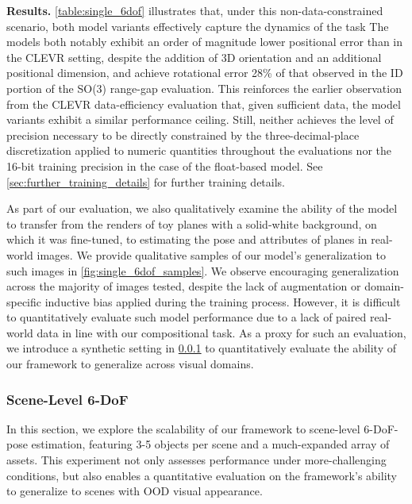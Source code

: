 \noindent\textbf{Results.}
\cref{table:single_6dof} illustrates that, under this non-data-constrained scenario, both model variants effectively capture the dynamics of the task
The models both notably exhibit an order of magnitude lower positional error than in the CLEVR setting, despite the addition of 3D orientation and an additional positional dimension, and achieve rotational error 28\% of that observed in the ID portion of the SO(3) range-gap evaluation.
This reinforces the earlier observation from the CLEVR data-efficiency evaluation that, given sufficient data, the model variants exhibit a similar performance ceiling.
Still, neither achieves the level of precision necessary to be directly constrained by the three-decimal-place discretization applied to numeric quantities throughout the evaluations nor the 16-bit training precision in the case of the float-based model.
See \cref{sec:further_training_details} for further training details.

As part of our evaluation, we also qualitatively examine the ability of the model to transfer from the renders of toy planes with a solid-white background, on which it was fine-tuned, to estimating the pose and attributes of planes in real-world images.
We provide qualitative samples of our model's generalization to such images in \cref{fig:single_6dof_samples}.
We observe encouraging generalization across the majority of images tested, despite the lack of augmentation or domain-specific inductive bias applied during the training process.
However, it is difficult to quantitatively evaluate such model performance due to a lack of paired real-world data in line with our compositional task.
As a proxy for such an evaluation, we introduce a synthetic setting in \cref{sssec:scene_6dof} to quantitatively evaluate the ability of our framework to generalize across visual domains.

\subsubsection{Scene-Level 6-DoF}\label{sssec:scene_6dof}


In this section, we explore the scalability of our framework to scene-level 6-DoF-pose estimation, featuring 3-5 objects per scene and a much-expanded array of assets.
This experiment not only assesses performance under more-challenging conditions, but also enables a quantitative evaluation on the framework's ability to generalize to scenes with OOD visual appearance.

